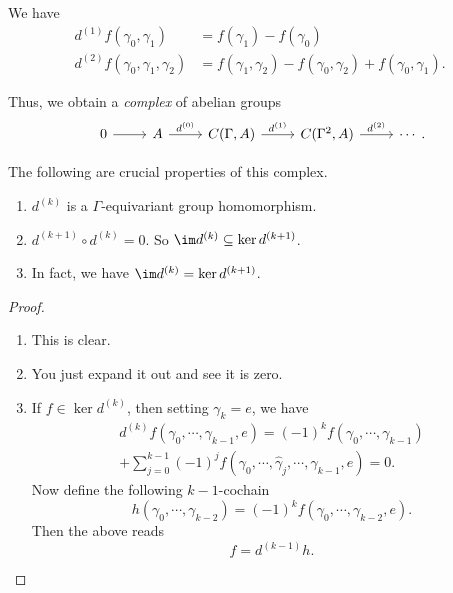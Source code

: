 \documentclass[a4paper]{article}
\begin{document}
\begin{eg}
  We have
  \begin{align*}
    d^{(1)} f(\gamma_0, \gamma_1) &= f(\gamma_1) - f(\gamma_0)\\
    d^{(2)} f(\gamma_0, \gamma_1, \gamma_2) &= f(\gamma_1, \gamma_2) - f(\gamma_0, \gamma_2) + f(\gamma_0, \gamma_1).
  \end{align*}
\end{eg}

Thus, we obtain a \emph{complex} of abelian groups
\[
  \begin{tikzcd}
    0 \ar[r] & A \ar[r, "d^{(0)}"] & C(\Gamma, A) \ar[r, "d^{(1)}"] & C(\Gamma^2, A) \ar[r, "d^{(2)}"] & \cdots
  \end{tikzcd}.
\]

The following are crucial properties of this complex.
\begin{lemma}\leavevmode
  \begin{enumerate}
    \item $d^{(k)}$ is a $\Gamma$-equivariant group homomorphism.
    \item $d^{(k + 1)} \circ d^{(k)} = 0 $. So $\im d^{(k)} \subseteq \ker d^{(k + 1)}$.
    \item In fact, we have $\im d^{(k)} = \ker d^{(k + 1)}$.
  \end{enumerate}
\end{lemma}

\begin{proof}\leavevmode
  \begin{enumerate}
    \item This is clear.
    \item You just expand it out and see it is zero.
    \item If $f \in \ker d^{(k)}$, then setting $\gamma_k = e$, we have
      \begin{multline*}
        d^{(k)} f(\gamma_0, \cdots, \gamma_{k - 1}, e) = (-1)^k f(\gamma_0, \cdots, \gamma_{k - 1}) \\
        + \sum_{j = 0}^{k - 1} (-1)^j f(\gamma_0, \cdots, \hat{\gamma}_j, \cdots, \gamma_{k - 1}, e) = 0.
      \end{multline*}
      Now define the following $k - 1$-cochain
      \[
        h(\gamma_0, \cdots, \gamma_{k - 2}) = (-1)^k f(\gamma_0, \cdots, \gamma_{k - 2}, e).
      \]
      Then the above reads
      \[
        f = d^{(k - 1)} h.
      \]
  \end{enumerate}
\end{proof}
\end{document}
